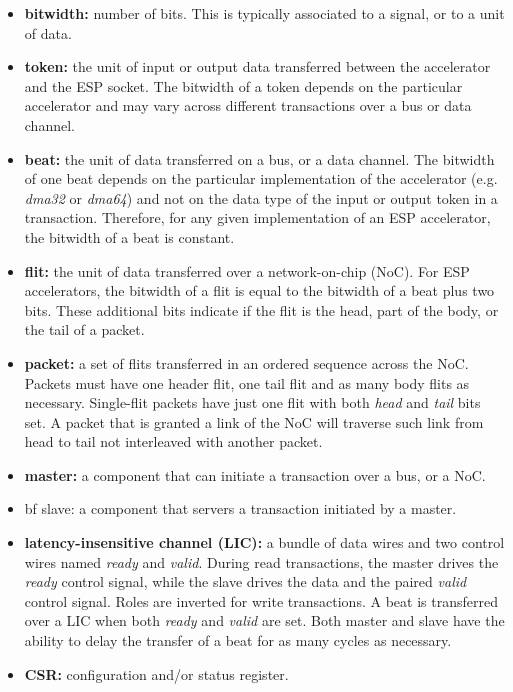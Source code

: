 \begin{itemize}
  \item {\bf bitwidth:} number of bits. This is typically associated to a
    signal, or to a unit of data.
  \item {\bf token:} the unit of input or output data transferred between the
    accelerator and the ESP socket. The bitwidth of a token depends on the
    particular accelerator and may vary across different transactions over a bus
    or data channel.
  \item {\bf beat:} the unit of data transferred on a bus, or a  data
    channel. The bitwidth of one beat depends on the particular implementation
    of the accelerator (e.g. {\it dma32} or {\it dma64}) and not on the data
    type of the input or output token in a transaction. Therefore, for any given
    implementation of an ESP accelerator, the bitwidth of a beat is constant.
  \item {\bf flit:} the unit of data transferred over a network-on-chip
    (NoC). For ESP accelerators, the bitwidth of a flit is equal to the bitwidth
    of a beat plus two bits. These additional bits indicate if the flit is the
    head, part of the body, or the tail of a packet.
  \item {\bf packet:} a set of flits transferred in an ordered sequence across
    the NoC. Packets must have one header flit, one tail flit and as many body
    flits as necessary. Single-flit packets have just one flit with both {\it
      head} and {\it tail} bits set. A packet that is granted a link of the NoC
    will traverse such link from head to tail not interleaved with another
    packet.
  \item {\bf master:} a component that can initiate a transaction over a bus, or
    a NoC.
  \item {bf slave:} a component that servers a transaction initiated by a master.
  \item {\bf latency-insensitive channel (LIC):} a bundle of data wires and two
    control wires named {\it ready} and {\it valid}. During read transactions, the
    master drives the {\it ready} control signal, while the slave drives the
    data and the paired {\it valid} control signal. Roles are inverted for write
    transactions. A beat is transferred over a LIC when both {\it ready} and
    {\it valid} are set. Both master and slave have the ability to delay the
    transfer of a beat for as many cycles as necessary.
  \item {\bf CSR:} configuration and/or status register.
\end{itemize}

